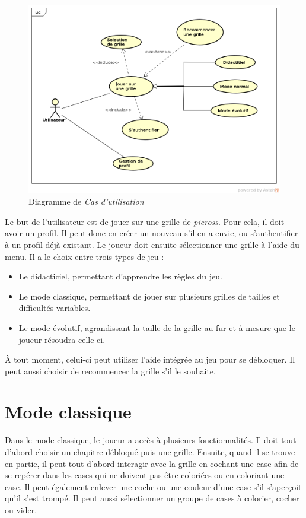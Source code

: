 \documentclass{report}
\begin{document}
    \begin{figure}[H]
	\caption{Diagramme de \textit{Cas d'utilisation}}
	\includegraphics[width=17cm]{../UML/UseCase_diagram/UseCase1.png}
    \end{figure}
    

	Le but de l'utilisateur est de jouer sur une grille de \textit{picross}.
Pour cela, il doit avoir un profil. Il peut donc en créer un nouveau s'il en a envie, ou s'authentifier à un profil déjà existant.
	Le joueur doit ensuite sélectionner une grille à l'aide du menu. Il a le choix entre trois types de jeu :
	\begin{itemize}
	\item Le didacticiel, permettant d'apprendre les règles du jeu. 
	\item Le mode classique, permettant de jouer sur plusieurs grilles de tailles et difficultés variables.
	\item Le mode évolutif, agrandissant la taille de la grille au fur et à mesure que le joueur résoudra celle-ci.
	\end{itemize}
	
	À tout moment, celui-ci peut utiliser l'aide intégrée au jeu pour se débloquer. Il peut aussi choisir de recommencer la grille s'il le souhaite.

      
	\section{Mode classique}
		Dans le mode classique, le joueur a accès à plusieurs fonctionnalités. Il doit tout d'abord choisir un chapitre débloqué puis une grille. Ensuite, quand il se trouve en partie, il peut tout d'abord interagir avec la grille en cochant une case afin de se repérer dans les cases qui ne doivent pas être coloriées ou en coloriant une case. Il peut également enlever une coche ou une couleur d'une case s'il s'aperçoit qu'il s'est trompé. Il peut aussi sélectionner un groupe de cases à colorier, cocher ou vider. 
		
\end{document}
